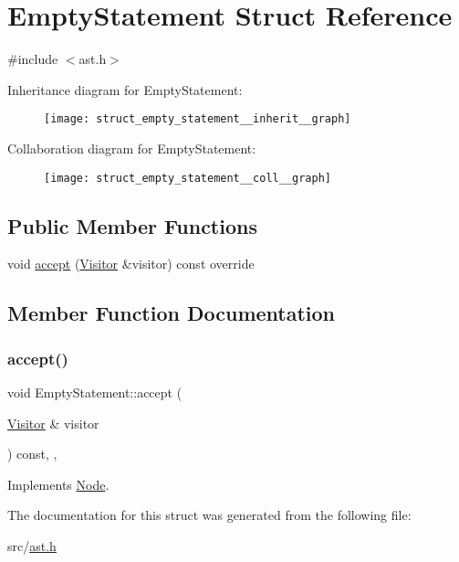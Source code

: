 \hypertarget{struct_empty_statement}{}\section{Empty\+Statement Struct Reference}
\label{struct_empty_statement}


{\ttfamily \#include $<$ast.\+h$>$}



Inheritance diagram for Empty\+Statement\+:\nopagebreak
\begin{figure}[H]
\begin{center}
\leavevmode
\texttt{[image: struct\_empty\_statement\_\_inherit\_\_graph]}
\end{center}
\end{figure}


Collaboration diagram for Empty\+Statement\+:\nopagebreak
\begin{figure}[H]
\begin{center}
\leavevmode
\texttt{[image: struct\_empty\_statement\_\_coll\_\_graph]}
\end{center}
\end{figure}
\subsection*{Public Member Functions}
\begin{DoxyCompactItemize}
\item 
void \hyperlink{struct_empty_statement_af0d920224b9b982402a3a72030d49eed}{accept} (\hyperlink{struct_visitor}{Visitor} \&visitor) const override
\end{DoxyCompactItemize}


\subsection{Member Function Documentation}
\mbox{\label{struct_empty_statement_af0d920224b9b982402a3a72030d49eed}} 
\subsubsection{\texorpdfstring{accept()}{accept()}}
{\footnotesize\ttfamily void Empty\+Statement\+::accept (\begin{DoxyParamCaption}\item[{\hyperlink{struct_visitor}{Visitor} \&}]{visitor }\end{DoxyParamCaption}) const\hspace{0.3cm}{\ttfamily [inline]}, {\ttfamily [override]}, {\ttfamily [virtual]}}



Implements \hyperlink{struct_node_a10bd7af968140bbf5fa461298a969c71}{Node}.



The documentation for this struct was generated from the following file\+:\begin{DoxyCompactItemize}
\item 
src/\hyperlink{ast_8h}{ast.\+h}\end{DoxyCompactItemize}
